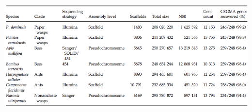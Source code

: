 \begin{table}
\caption{Genome assembly summary for \textit{Polistes dominula} and six other \mbox{Hymenoptera}.}
\centering
\includegraphics[width=6in]{Assets/Graphics/Pdom/table-01}
\label{Table:Pdom1}
\end{table}

